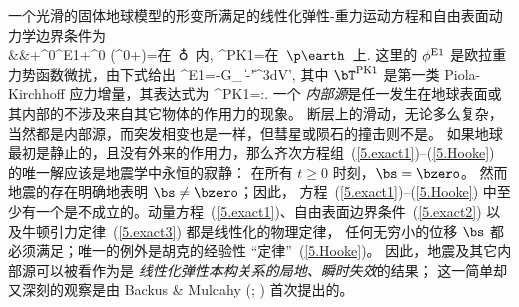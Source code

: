 一个光滑的固体地球模型的形变所满足的线性化弹性-重力运动方程和自由表面动力学边界条件为
\eqa
\label{5.exact1}
 \nonumber \\
&&\mbox{}+\rho^0\bdel\phi^{\rm E1}+\rho^0\bs\cdot
\bdel\bdel(\phi^0+\psi)=\bzero\quad\mbox{在 $\earth$ 内},
\ena
\eq
\label{5.exact2}
\bnh\cdot\bT^{\rm PK1}=\bzero\quad\mbox{在 $\p\earth$ 上}.
\en
这里的 $\phi^{\rm E1}$ 是欧拉重力势函数微扰，由下式给出
\eq
\label{5.exact3}
\phi^{\rm E1}=-G\int_{\subearth}
{\|\bx-\bx'\|^3}dV',
\en
其中 $\bT^{\rm PK1}$ 是第一类 Piola-Kirchhoff 应力增量，其表达式为
\eq
\label{5.Hooke}
\bT^{\rm PK1}=\bLambda\!:\!\bdel\bs.
\en
一个 {\em 内部源\/}是任一发生在地球表面或其内部的不涉及来自其它物体的作用力的现象。
%
%
断层上的滑动，无论多么复杂，当然都是内部源，而突发相变也是一样，但彗星或陨石的撞击则不是。
如果地球最初是静止的，且没有外来的作用力，那么齐次方程组~(\ref{5.exact1})--(\ref{5.Hooke}) 的唯一解应该是地震学中永恒的寂静：
在所有 $t\geq 0$ 时刻，$\bs=\bzero$。
然而地震的存在明确地表明
$\bs\not=\bzero$；因此，
方程~(\ref{5.exact1})--(\ref{5.Hooke}) 中至少有一个是不成立的。动量方程~(\ref{5.exact1})、自由表面边界条件~(\ref{5.exact2}) 以及牛顿引力定律~(\ref{5.exact3}) 都是线性化的物理定律，
任何无穷小的位移 $\bs$ 都必须满足；唯一的例外是胡克的经验性 ``定律''~(\ref{5.Hooke})。
因此，地震及其它内部源可以被看作为是 {\em 线性化弹性本构关系的局地、瞬时失效\/}的结果；
%
%
这一简单却又深刻的观察是由
 Backus \& Mulcahy (\citeyear{backus&mulcahy76a};
\citeyear{backus&mulcahy76b}) 首次提出的。

